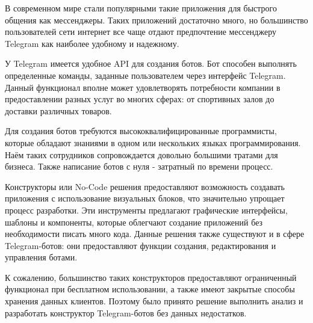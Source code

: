 
В современном мире стали популярными такие приложения для
быстрого общения как мессенджеры. Таких приложений достаточно много, но
большинство пользователей сети интернет все чаще отдают предпочтение
мессенджеру Telegram как наиболее удобному и надежному.

У Telegram имеется удобное API для создания ботов. Бот способен
выполнять определенные команды, заданные пользователем через интерфейс
Telegram. Данный функционал вполне может удовлетворять потребности
компании в предоставлении разных услуг во многих сферах: от спортивных залов
до доставки различных товаров.

Для создания ботов требуются высококвалифицированные программисты, которые
обладают знаниями в одном или нескольких языках программирования.
Наём таких сотрудников сопровождается довольно большими тратами для бизнеса.
Также написание ботов с нуля - затратный по времени процесс.

Конструкторы или No-Code решения предоставляют возможность создавать
приложения с использование визуальных блоков, что значительно упрощает процесс
разработки. Эти инструменты предлагают графические интерфейсы, шаблоны и
компоненты, которые облегчают создание приложений без необходимости писать
много кода.
Данные решения также существуют и в сфере Telegram-ботов: они
предоставляют функции создания, редактирования и управления ботами.

К сожалению, большинство таких конструкторов предоставляют ограниченный функционал
при бесплатном использовании, а также имеют закрытые
способы хранения данных клиентов. Поэтому было принято решение выполнить анализ и
разработать конструктор Telegram-ботов без данных недостатков.


\pagebreak



